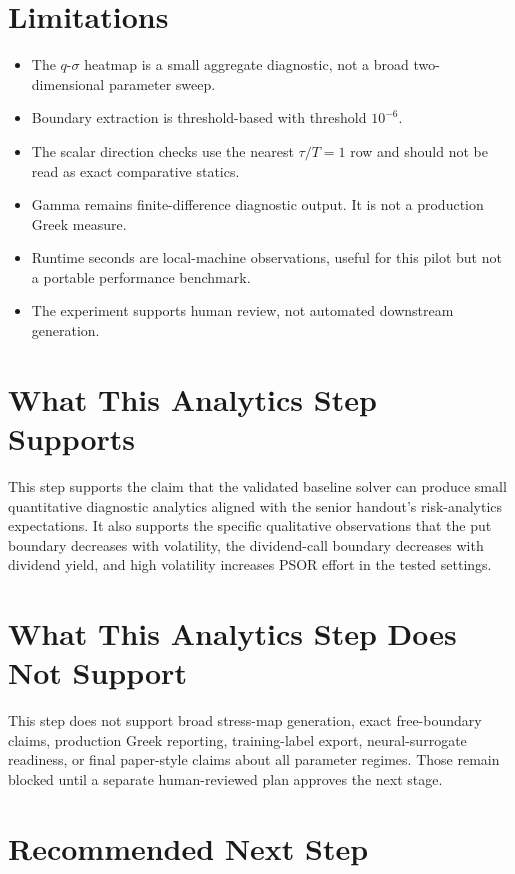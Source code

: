 \documentclass[11pt,a4paper]{article}
\begin{document}
\section{Limitations}

\begin{itemize}
  \item The \(q\)-\(\sigma\) heatmap is a small aggregate diagnostic, not a broad two-dimensional
  parameter sweep.
  \item Boundary extraction is threshold-based with threshold \(10^{-6}\).
  \item The scalar direction checks use the nearest \(\tau/T=1\) row and should not be read as
  exact comparative statics.
  \item Gamma remains finite-difference diagnostic output. It is not a production Greek measure.
  \item Runtime seconds are local-machine observations, useful for this pilot but not a portable
  performance benchmark.
  \item The experiment supports human review, not automated downstream generation.
\end{itemize}

\section{What This Analytics Step Supports}

This step supports the claim that the validated baseline solver can produce small quantitative
diagnostic analytics aligned with the senior handout's risk-analytics expectations. It also
supports the specific qualitative observations that the put boundary decreases with volatility,
the dividend-call boundary decreases with dividend yield, and high volatility increases PSOR
effort in the tested settings.

\section{What This Analytics Step Does Not Support}

This step does not support broad stress-map generation, exact free-boundary claims, production
Greek reporting, training-label export, neural-surrogate readiness, or final paper-style claims
about all parameter regimes. Those remain blocked until a separate human-reviewed plan approves
the next stage.

\section{Recommended Next Step}
\end{document}
